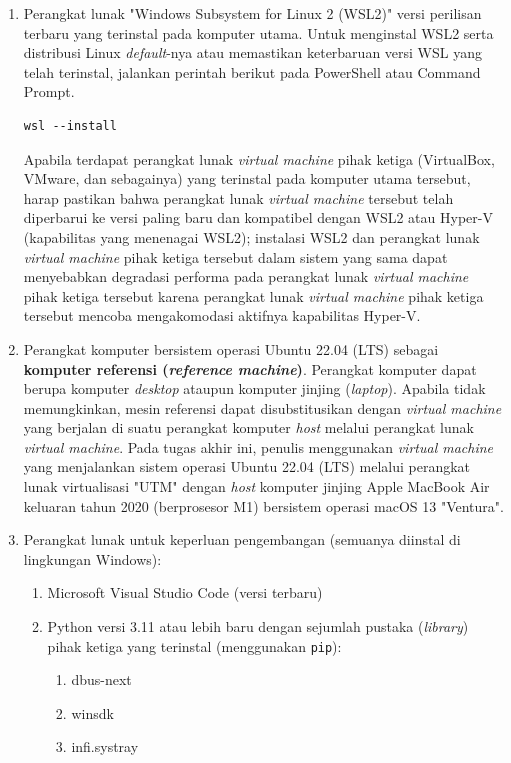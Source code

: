\begin{enumerate}
    \item Perangkat lunak "Windows Subsystem for Linux 2 (WSL2)" versi perilisan terbaru yang terinstal pada komputer utama. Untuk menginstal WSL2 serta distribusi Linux \textit{default}-nya atau memastikan keterbaruan versi WSL yang telah terinstal, jalankan perintah berikut pada PowerShell atau Command Prompt.
    \begin{lstlisting}
wsl --install\end{lstlisting}
    Apabila terdapat perangkat lunak \textit{virtual machine} pihak ketiga (VirtualBox, VMware, dan sebagainya) yang terinstal pada komputer utama tersebut, harap pastikan bahwa perangkat lunak \textit{virtual machine} tersebut telah diperbarui ke versi paling baru dan kompatibel dengan WSL2 atau Hyper-V (kapabilitas yang menenagai WSL2); instalasi WSL2 dan perangkat lunak \textit{virtual machine} pihak ketiga tersebut dalam sistem yang sama dapat menyebabkan degradasi performa pada perangkat lunak \textit{virtual machine} pihak ketiga tersebut karena perangkat lunak \textit{virtual machine} pihak ketiga tersebut mencoba mengakomodasi aktifnya kapabilitas Hyper-V.

    \item Perangkat komputer bersistem operasi Ubuntu 22.04 (LTS) sebagai \textbf{komputer referensi (\textit{reference machine})}. Perangkat komputer dapat berupa komputer \textit{desktop} ataupun komputer jinjing (\textit{laptop}). Apabila tidak memungkinkan, mesin referensi dapat disubstitusikan dengan \textit{virtual machine} yang berjalan di suatu perangkat komputer \textit{host} melalui perangkat lunak \textit{virtual machine}. Pada tugas akhir ini, penulis menggunakan \textit{virtual machine} yang menjalankan sistem operasi Ubuntu 22.04 (LTS) melalui perangkat lunak virtualisasi "UTM" dengan \textit{host} komputer jinjing Apple MacBook Air keluaran tahun 2020 (berprosesor M1) bersistem operasi macOS 13 "Ventura".

    \item Perangkat lunak untuk keperluan pengembangan (semuanya diinstal di lingkungan Windows):
    \begin{enumerate}
        \item Microsoft Visual Studio Code (versi terbaru)
        \item Python versi 3.11 atau lebih baru dengan sejumlah pustaka (\textit{library}) pihak ketiga yang terinstal (menggunakan \verb|pip|):
        \begin{enumerate}
            \item dbus-next
            \item winsdk
            \item infi.systray
        \end{enumerate}
    \end{enumerate}
    

\end{enumerate}
